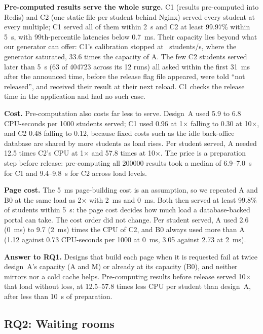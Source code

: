 \textbf{Pre-computed results serve the whole surge.} C1 (results pre-computed
into Redis) and C2 (one static file per student behind Nginx) served every
student at every multiple; C1 served all of them within \SI{2}{s} and C2 at
least 99.97\% within \SI{5}{s}, with 99th-percentile latencies below
\SI{0.7}{ms}. Their capacity lies beyond what our generator can offer: C1's
calibration stopped at \CapCOne\ students/s, where the generator saturated,
33.6 times the capacity of A. The few C2 students served later than
\SI{5}{s} (63 of \num{404723} across its 12 runs) all asked within the first
\SI{31}{ms} after the announced time, before the release flag file appeared,
were told ``not released'', and received their result at their next reload.
C1 checks the release time in the application and had no such case.

\textbf{Cost.} Pre-computation also costs far less to serve. Design~A used
\num{5.9} to \num{6.8} CPU-seconds per \num{1000} students served; C1 used
\num{0.96} at 1$\times$ falling to \num{0.30} at 10$\times$, and C2 \num{0.48}
falling to \num{0.12}, because fixed costs such as the idle back-office
database are shared by more students as load rises. Per
student served, A needed 12.5 times C2's CPU at 1$\times$ and 57.8 times at
10$\times$. The price is a preparation step before release: pre-computing all
\num{200000} results took a median of 6.9--\SI{7.0}{s} for C1 and
9.4--\SI{9.8}{s} for C2 across load levels.

\textbf{Page cost.} The \SI{5}{ms} page-building cost is an assumption, so we
repeated A and B0 at the same load as 2$\times$ with \SI{2}{ms} and \SI{0}{ms}.
Both then served at least 99.8\% of students within \SI{5}{s}: the page cost
decides how much load a database-backed portal can take. The cost order did
not change. Per student served, A used 2.6 (\SI{0}{ms}) to 9.7 (\SI{2}{ms})
times the CPU of C2, and B0 always used more than A (1.12 against 0.73
CPU-seconds per \num{1000} at \SI{0}{ms}, 3.05 against 2.73 at \SI{2}{ms}).

\textbf{Answer to RQ1.} Designs that build each page when it is requested fail
at twice design~A's capacity (A and M) or already at its capacity (B0), and
neither mirrors nor a cold cache helps. Pre-computing results before release
served 10$\times$ that load without loss, at 12.5--57.8 times less CPU per
student than design~A, after less than \SI{10}{s} of preparation.

\subsection{RQ2: Waiting rooms}
\label{sec:rq2}

